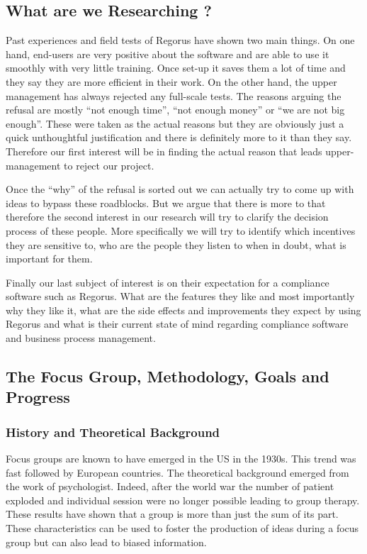 \documentclass[10pt]{report}
\begin{document}
\subsection{What are we Researching ?}
Past experiences and field tests of Regorus have shown two main things. On one hand, end-users are very positive about the software and are able to use it smoothly with very little training. Once set-up it saves them a lot of time and they say they are more efficient in their work. On the other hand, the upper management has always rejected any full-scale tests. The reasons arguing the refusal are mostly \enquote{not enough time}, \enquote{not enough money} or \enquote{we are not big enough}. These were taken as the actual reasons but they are obviously just a quick unthoughtful justification and there is definitely more to it than they say. Therefore our first interest will be in finding the actual reason that leads upper-management to reject our project.

Once the \enquote{why} of the refusal is sorted out we can actually try to come up with ideas to bypass these roadblocks. But we argue that there is more to that therefore the second interest in our research will try to clarify the decision process of these people. More specifically we will try to identify which incentives they are sensitive to, who are the people they listen to when in doubt, what is important for them.

Finally our last subject of interest is on their expectation for a compliance software such as Regorus. What are the features they like and most importantly why they like it, what are the side effects and improvements they expect by using Regorus and what is their current state of mind regarding compliance software and business process management.



\subsection{The Focus Group, Methodology, Goals and Progress}

\subsubsection{History and Theoretical Background}
Focus groups are known to have emerged in the US in the 1930s. This trend was fast followed by European countries. The theoretical background emerged from the work of psychologist. Indeed, after the world war the number of patient exploded and individual session were no longer possible leading to group therapy. These results have shown that a group is more than just the sum of its part. These characteristics can be used to foster the production of ideas during a focus group but can also lead to biased information.
\end{document}
